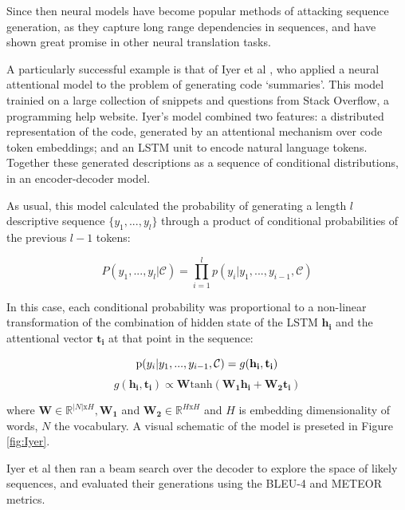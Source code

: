Since then neural models have become popular methods of attacking sequence generation, as they capture long range dependencies in sequences, and have shown great promise in other neural translation tasks.

A particularly successful example is that of Iyer et al \cite{iyer_summarizing_2016}, who applied a neural attentional model to the problem of generating code `summaries'. This model trainied on a large collection of snippets and questions from Stack Overflow, a programming help website.   Iyer's model combined two features: a distributed representation of the code, generated by an attentional mechanism \cite{luong_effective_2015} over code token embeddings; and an LSTM unit \cite{hochreiter_long_1997} to encode natural language tokens. Together these generated descriptions as a sequence of conditional distributions, in an encoder-decoder model. 

As usual, this model calculated the probability of generating a length $l$
descriptive sequence $\{y_1,...,y_l\}$ through a product of conditional probabilities of the previous $l-1$ tokens:

$$P(y_1,...,y_l| \mathcal{C}) = \prod_{i=1}^lp(y_i | y_1, ..., y_{i-1}, \mathcal{C} ) $$

In this case, each conditional probability was proportional to a non-linear transformation of the combination of hidden state of the LSTM $\mathbf{h_i}$ and the attentional vector  $\mathbf{t_i}$ at that point in the sequence: 

$$\text p(y_i | y_1, ..., y_{i-1},\mathcal{C} ) = g(\mathbf{h_i}, \mathbf{t_i}) $$
$$g(\mathbf{h_i}, \mathbf{t_i})  \propto \mathbf{W}\text{tanh}(\mathbf{W_1h_i} + \mathbf{W_2t_i})$$

where $\mathbf{W} \in \mathbb{R}^{|N|\text{x} H}, \mathbf{W_1}$ and $\mathbf{W_2} \in \mathbb{R}^{H \text{x} H}$  and $ H$ is embedding dimensionality of words, $ N $ the vocabulary.\cite{iyer_summarizing_2016}
A visual schematic of the model is preseted in Figure \ref{fig:Iyer}.

Iyer et al then ran a beam search over the decoder to explore the space of likely sequences, and evaluated their generations using the BLEU-4 and METEOR metrics.

